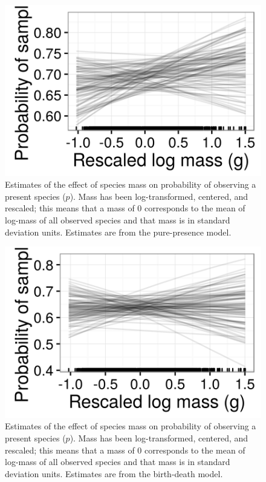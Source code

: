 \documentclass[12pt,letterpaper]{article}
\begin{document}
\begin{figure}[ht]
  \centering
  \includegraphics[width=\textwidth,height=0.8\textheight,keepaspectratio=true]{figure/mass_on_samp}
  \caption[Estimates of the effect of mass on observation probability from the pure-presence model]{Estimates of the effect of species mass on probability of observing a present species (\(p\)). Mass has been log-transformed, centered, and rescaled; this means that a mass of 0 corresponds to the mean of log-mass of all observed species and that mass is in standard deviation units. Estimates are from the pure-presence model.}
  \label{fig:mass_preserve_pure_pres}
\end{figure}

\begin{figure}[ht]
  \centering
  \includegraphics[width=\textwidth,height=0.8\textheight,keepaspectratio=true]{figure/mass_on_samp_bd}
  \caption[Estimates of the effect of mass on observation probability from the birth-death model]{Estimates of the effect of species mass on probability of observing a present species (\(p\)). Mass has been log-transformed, centered, and rescaled; this means that a mass of 0 corresponds to the mean of log-mass of all observed species and that mass is in standard deviation units. Estimates are from the birth-death model.}
  \label{fig:mass_preserve_bd}
\end{figure}
\end{document}
